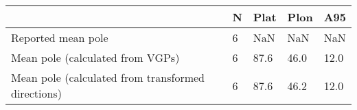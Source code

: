 \begin{tabular}{lllll}
\toprule
{} &  N &  Plat &  Plon &   A95 \\
\midrule
Reported mean pole                                 &  6 &   NaN &   NaN &   NaN \\
Mean pole (calculated from VGPs)                   &  6 &  87.6 &  46.0 &  12.0 \\
Mean pole (calculated from transformed directions) &  6 &  87.6 &  46.2 &  12.0 \\
\bottomrule
\end{tabular}
